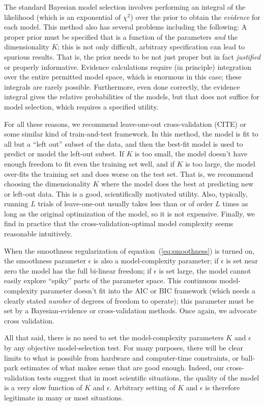 \documentclass[12pt,preprint]{aastex}
\newcommand{\equationname}{equation}
\begin{document}
The standard Bayesian model selection involves performing an integral
of the likelihood (which is an exponential of $\chi^2$) over the prior
to obtain the \emph{evidence} for each model.  This method also has
several problems including the following: A proper prior must be
specified that is a function of the parameters \emph{and} the
dimensionality $K$; this is not only difficult, arbitrary
specification can lead to spurious results.  That is, the prior needs
to be not just proper but in fact \emph{justified} or properly
informative.  Evidence calculations require (in principle) integration
over the entire permitted model space, which is enormous in this case;
these integrals are rarely possible.  Furthermore, even done
correctly, the evidence integral gives the relative probabilities of
the models, but that does not suffice for model selection, which
requires a specified utility.

For all these reasons, we recommend leave-one-out cross-validation
(CITE) or some similar kind of train-and-test framework.  In this
method, the model is fit to all but a ``left out'' subset of the data,
and then the best-fit model is used to predict or model the left-out
subset.  If $K$ is too small, the model doesn't have enough freedom to
fit even the training set well, and if $K$ is too large, the model
over-fits the training set and does worse on the test set.  That is,
we recommend choosing the dimensionality $K$ where the model does the
best at predicting new or left-out data.  This is a good,
scientifically motivated utility.  Also, typically, running $L$ trials
of leave-one-out usually takes less than or of order $L$ times as long
as the original optimization of the model, so it is not expensive.
Finally, we find in practice that the cross-validation-optimal model
complexity seems reasonable intuitively.

When the smoothness regularization of
\equationname~(\ref{eq:smoothness}) is turned on, the smoothness
parameter $\epsilon$ is also a model-complexity parameter; if
$\epsilon$ is set near zero the model has the full bi-linear freedom;
if $\epsilon$ is set large, the model cannot easily explore ``spiky''
parts of the parameter space.  This continuous model-complexity
parameter doesn't fit into the AIC or BIC framework (which needs a
clearly stated \emph{number} of degrees of freedom to operate); this
parameter must be set by a Bayesian-evidence or cross-validation
methods.  Once again, we advocate cross validation.

All that said, there is no need to set the model-complexity parameters
$K$ and $\epsilon$ by any objective model-selection test.  For many
purposes, there will be clear limits to what is possible from hardware
and computer-time constraints, or ball-park estimates of what makes
sense that are good enough.  Indeed, our cross-validation tests
suggest that in most scientific situations, the quality of the model
is a very slow function of $K$ and $\epsilon$.  Arbitrary setting of
$K$ and $\epsilon$ is therefore legitimate in many or most situations.
\end{document}
